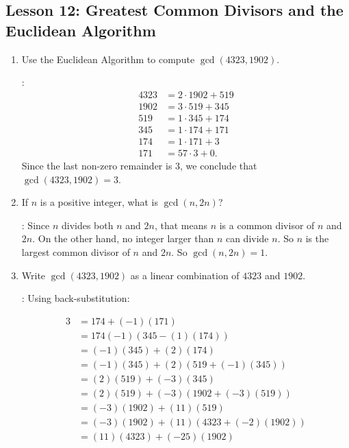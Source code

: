 \documentclass[11pt]{amsart}
\begin{document}
\subsection{Lesson 12: Greatest Common Divisors and the Euclidean Algorithm}

\begin{enumerate}

\medskip

\item Use the Euclidean Algorithm to compute $\gcd(4323, 1902)$.

\medskip
{}: 
\begin{align*}
 4323 &= 2\cdot1902+519\\
 1902 &= 3\cdot 519 + 345\\
  519 &= 1\cdot345+174 \\
  345 &= 1\cdot174+ 171 \\
  174 &= 1\cdot171+3 \\
  171  &= 57\cdot3+0.
\end{align*}
Since the last non{-}zero remainder is $3$, we conclude that
$\gcd(4323,1902)=3$.

\medskip

\item If $n$ is a positive integer, what is $\gcd(n, 2n)$?

\medskip
{}:  Since $n$ divides both $n$ and $2n$, that means $n$
is a common divisor of $n$ and $2n$. On the other hand, no integer larger
than $n$ can divide $n$. So $n$ is the largest common divisor of $n$ and $2n$.
So $\gcd(n,2n) = 1$.

\medskip

\item Write $\gcd(4323,1902)$ as a linear combination of $4323$ and $1902$.

\medskip
{}:  Using back-substitution:
 
 \begin{align*}
 3 & = 174+ (-1)(171)\\
   & =  174 (-1)(345-(1)(174))\\
   & = (-1)(345) +(2)(174)\\
   & = (-1)(345) + (2)(519 + (-1)(345))\\
   & = (2)(519) + (-3)(345)\\
   & = (2)(519) + (-3)( 1902 +(-3)(519))\\
   & = (-3)(1902) + (11)(519)\\
   & = (-3)(1902)+(11)(4323+(-2)(1902))\\
   & = (11)(4323) + (-25)(1902)\\
 \end{align*}
 

\end{enumerate}
\end{document}
